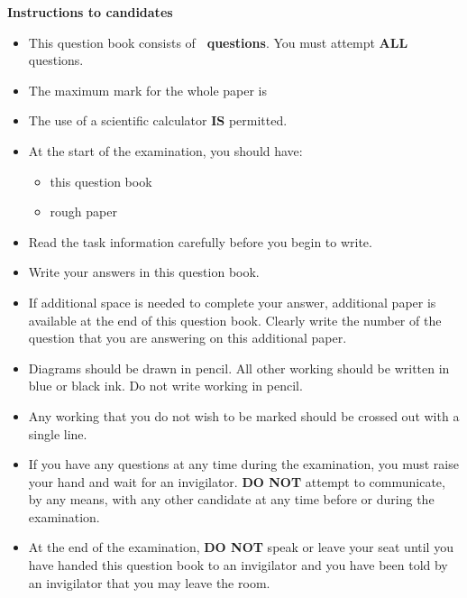 \documentclass[a4paper,addpoints,12pt]{exam}
\begin{document}
\begin{adjustwidth}{0mm}{-10mm}
\begin{minipage}{\textwidth}

\begin{small}

\textbf{Instructions to candidates}

\begin{itemize}
\item This question book consists of \textbf{\numquestions\ questions}. You must attempt \textbf{ALL} questions.
\item The maximum mark for the whole paper is \textbf{\numpoints} 
\item The use of a scientific calculator \textbf{IS} permitted.
\item At the start of the examination, you should have:
\begin{adjustwidth}{20mm}{}
\begin{itemize}    
\item[\textbullet] this question book    
\item[\textbullet] rough paper
\end{itemize}
\end{adjustwidth}
\item Read the task information carefully before you begin to write.
\item Write your answers in this question book.
\item If additional space is needed to complete your answer, additional paper is available at the end of this question book. Clearly write the number of the question that you are answering on this additional paper.
\item Diagrams should be drawn in pencil. All other working should be written in blue or black ink. Do not write working in pencil.\item Any working that you do not wish to be marked should be crossed out with a single line.
\item If you have any questions at any time during the examination, you must raise your hand and wait for an invigilator. \textbf{DO NOT} attempt to communicate, by any means, with any other candidate at any time before or during the examination.
\item At the end of the examination, \textbf{DO NOT} speak or leave your seat until you have handed this question book to an invigilator and you have been told by an invigilator that you may leave the room.
\end{itemize}


\end{small}
\end{minipage}
\end{adjustwidth}
\end{document}
